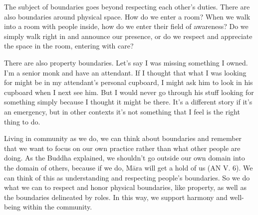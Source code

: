 The subject of boundaries goes beyond respecting each other's duties. 
There are also boundaries around physical space. How do we enter a 
room? When we walk into a room with people inside, how do we enter 
their field of awareness? Do we simply walk right in and announce our 
presence, or do we respect and appreciate the space in the room, 
entering with care?

There are also property boundaries. Let's say I was missing something I 
owned. I'm a senior monk and have an attendant. If I thought that what 
I was looking for might be in my attendant's personal cupboard, I might 
ask him to look in his cupboard when I next see him. But I would never 
go through his stuff looking for something simply because I thought it 
might be there. It's a different story if it's an emergency, but in 
other contexts it's not something that I feel is the right thing to do.

Living in community as we do, we can think about boundaries and 
remember that we want to focus on our own practice rather than what 
other people are doing. As the Buddha explained, we shouldn't go 
outside our own domain into the domain of others, because if we do, 
Māra will get a hold of us (AN V. 6). We can think of this as 
understanding and respecting people's boundaries. So we do what we can 
to respect and honor physical boundaries, like property, as well as the 
boundaries delineated by roles. In this way, we support harmony and 
well-being within the community.

